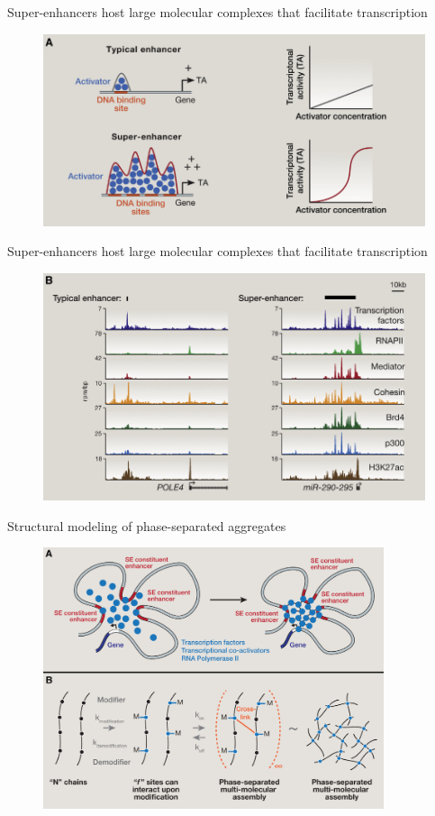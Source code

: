 \documentclass[aspectratio=1610]{beamer}					%
\begin{document}
\begin{frame}{Super-enhancers host large molecular complexes that facilitate transcription}
\begin{figure}
\includegraphics[width=14cm]{figure-5-1.png}
\end{figure}
\end{frame}

\begin{frame}{Super-enhancers host large molecular complexes that facilitate transcription}
\begin{figure}
\includegraphics[width=12cm]{figure-5-2.png}
\end{figure}
\end{frame}

\begin{frame}{Structural modeling of phase-separated aggregates}
\begin{figure}
\includegraphics[width=10cm]{figure-5-3.png}
\end{figure}
\end{frame}
\end{document}
